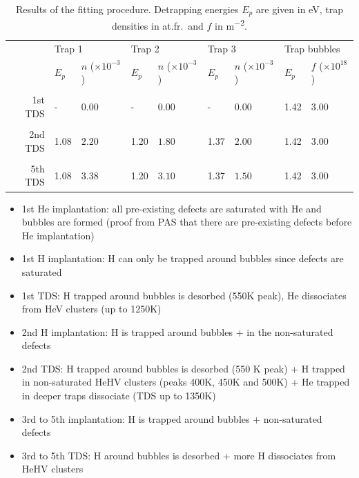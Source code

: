 \begin{table}[!h]
    \caption{Results of the fitting procedure. Detrapping energies $E_p$ are given in \si{eV}, trap densities in \si{at.fr.} and $f$ in \si{m^{-2}}.}
    \begin{tabular}{r l l l l l l l l}
    \\
    &\multicolumn{2}{l}{Trap 1}  & \multicolumn{2}{l}{Trap 2} & \multicolumn{2}{l}{Trap 3} &\multicolumn{2}{l}{Trap bubbles} \\
     & $E_p$ & $n$ ($\times 10 ^{-3}$) & $E_p$ & $n$ ($\times 10 ^{-3}$) & $E_p$ & $n$ ($\times 10 ^{-3}$) & $E_p$ & $f$ ($\times 10 ^{18}$) \\
    \\
    1st TDS & - & 0.00 & - & 0.00 & - & 0.00 & 1.42 & $3.00$ \\
    \\
    2nd TDS & 1.08 & $2.20$ & 1.20 & $1.80$ & 1.37 & $2.00$ & 1.42 & $3.00$ \\
    \\
    5th TDS & 1.08 & $3.38$ & 1.20 & $3.10$ & 1.37 & $1.50$ & 1.42 & $3.00$ \\
    \end{tabular}
    \label{tab: trap properties results}
\end{table}

\begin{itemize}
    \item 1st He implantation: all pre-existing defects are saturated with He and bubbles are formed (proof from PAS that there are pre-existing defects before He implantation)
    \item 1st H implantation: H can only be trapped around bubbles since defects are saturated
    \item 1st TDS: H trapped around bubbles is desorbed (550K peak), He dissociates from HeV clusters (up to 1250K)
    \item 2nd H implantation: H is trapped around bubbles + in the non-saturated defects
    \item 2nd TDS: H trapped around bubbles is desorbed (550 K peak) + H trapped in non-saturated HeHV clusters (peaks 400K, 450K and 500K) + He trapped in deeper traps dissociate (TDS up to 1350K)
    
    \item 3rd to 5th implantation: H is trapped around bubbles + non-saturated defects
    \item 3rd to 5th TDS: H around bubbles is desorbed + more H dissociates from HeHV clusters
\end{itemize}




